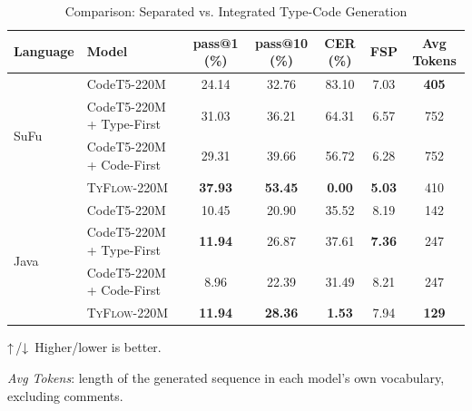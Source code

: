 \documentclass[manuscript,screen]{acmart}
\newcommand{\updir}{\textcolor{black}{↑}}  %
\newcommand{\downdir}{\textcolor{black}{↓}}
\newcommand{\toolname}[1]{\textsc{#1}}
\newcommand{\mainname}{\toolname{TyFlow}\xspace}
\begin{document}
\begin{table}[ht]
\centering
\begin{threeparttable}
\caption{Comparison: Separated vs. Integrated Type-Code Generation}
\label{tab:sequential-compare}
\begin{tabular}{
    l
    l
    c
    c
    c
    c
    c
}
\toprule
Language & Model & {pass@1 (\%)\tnote{\updir}} & {pass@10 (\%)\tnote{\updir}} & {CER (\%)\tnote{\downdir}} & {FSP\tnote{\downdir}} & {Avg Tokens\tnote{\downdir}} \\
\midrule
  \multirow{4}{*}{SuFu}
         &    {\color{revblue}CodeT5-220M                }& {\color{revblue}24.14 }& {\color{revblue}32.76 }& {\color{revblue}83.10 }& {\color{revblue}7.03 }& \textbf{\color{revblue}405} \\
        & {\color{revblue}CodeT5-220M } + Type-First   & 31.03 & 36.21 & 64.31 & 6.57 & 752 \\
        &    {\color{revblue}CodeT5-220M } + Code-First   & 29.31 & 39.66 & 56.72 & 6.28 & 752 \\
        & \mainname-220M             & \textbf{37.93} & \textbf{\color{revblue}53.45} & \textbf{0.00} & \textbf{\color{revblue}5.03} &  \textbf{} %
  {\color{revblue}410 } \\
\midrule
  \multirow{4}{*}{Java}
         &    {\color{revblue}CodeT5-220M                }& {\color{revblue}10.45 }& {\color{revblue}20.90 }& {\color{revblue}35.52 }& {\color{revblue}8.19 }& {\color{revblue}142 }\\
        & {\color{revblue}CodeT5-220M } + Type-First   & \textbf{11.94} & 26.87 & 37.61 & \textbf{7.36} & 247 \\
        &    {\color{revblue}CodeT5-220M } + Code-First   & 8.96 & 22.39 & 31.49 & 8.21 & 247 \\
        & \mainname-220M             & \textbf{11.94} & \textbf{28.36} & \textbf{\color{revblue}1.53} & 7.94 & \textbf{129} \\
\bottomrule
\end{tabular}
 \begin{tablenotes}
\footnotesize
\item {\color{revblue}\updir\,/\downdir\, Higher/lower is better.
}\item \emph{\color{revblue}Avg Tokens}{\color{revblue}: length of the generated sequence in each model's own vocabulary, excluding comments.
}\end{tablenotes}
 \end{threeparttable}
\end{table}
\end{document}
